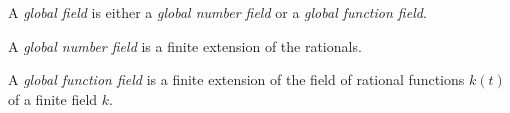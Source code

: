 \documentclass[12pt]{article}
\begin{document}
A \emph{global field} is either a \emph{global number field} or 
a \emph{global function field}.

A \emph{global number field} is a finite extension of the rationals.

A \emph{global function field} is a finite extension of the field of
rational functions $k(t)$ of a finite field $k$.


\end{document}
